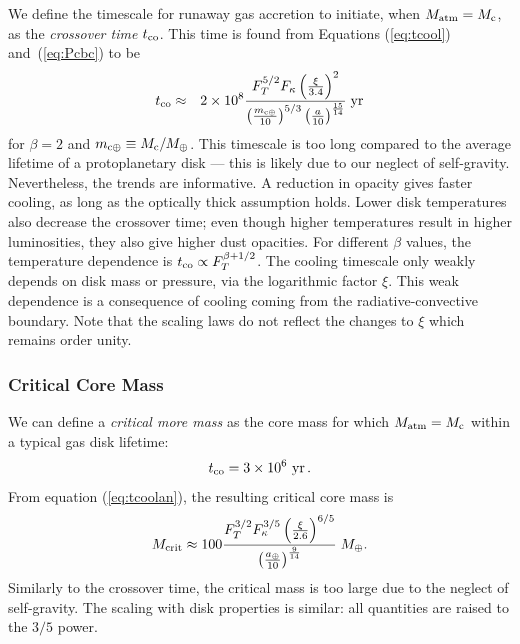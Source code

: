 \documentclass[apj]{emulateapj}
\newcommand{\yr}{\; {\rm yr}}
\newcommand{\Eqs}[2]{Equations (\ref{#1}) and~(\ref{#2})}
\newcommand{\mc}{m_{\rm c \oplus}}
\newcommand{\au}{a_\oplus}
\begin{document}
We define the timescale for runaway gas accretion to initiate, when $M_{\rm{atm}}=M_{\rm c}$, as the \textit{crossover time} $t_{\rm{co}}$. This time is found from \Eqs{eq:tcool}{eq:Pcbc} to be
\begin{eqnarray} 
\label{eq:tcoolan}
t_{\rm co} &\approx & 2 \times 10^8 {F_T^{5/2}  F_\kappa \left(\xi \over 3.4\right)^2  \over \left(\mc \over 10 \right)^{5/3} \left(a\over 10\right)^{15 \over 14}} \yr
\end{eqnarray} 
for $\beta = 2$ and $\mc \equiv M_{\rm c} / M_{\oplus}$.  
This timescale is too long compared to the average lifetime of a protoplanetary disk --- this is likely due to our neglect of self-gravity.  Nevertheless, the trends are informative.   A reduction in opacity gives faster cooling, as long as the optically thick assumption holds.  Lower disk temperatures also decrease the crossover time;  even though higher temperatures result in higher luminosities, they also give higher dust opacities.   For different $\beta$ values, the temperature dependence is $t_{\rm co} \propto F_T^{ \beta + 1/2}$.  The cooling timescale only weakly depends on disk mass or pressure, via the  logarithmic factor $\xi$.  This weak dependence is a consequence of cooling coming from the radiative-convective boundary.  Note that the scaling laws do not reflect the changes to $\xi$ which remains order unity. %



\subsubsection{Critical Core Mass}\label{sec:critmass}


We can define a \textit{critical more mass} as the core mass for which $M_{\rm{atm}}=M_{\rm c}$ within a typical gas disk lifetime:
\begin{equation}
t_{\rm co} = 3 \times 10^6 ~{\rm yr} \,.
\end{equation} 
From equation (\ref{eq:tcoolan}), the resulting critical core mass is
\begin{equation}\label{eq:Mcrit}
M_{\rm crit} \approx 100 {F_T^{3/2} F_\kappa^{3/5}   \left(\xi \over 2.6 \right)^{6/5} \over \left(\au \over 10\right)^{9 \over 14}} \; M_\oplus.
\end{equation} 
Similarly to the crossover time, the critical mass is too large due to the neglect of self-gravity.  The scaling with disk properties is similar: all quantities are raised to the $3/5$ power.  
\end{document}
